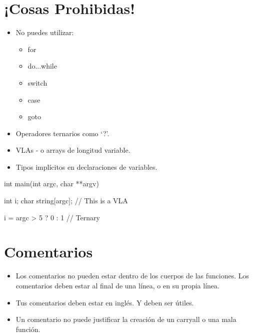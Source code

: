 \documentclass{42-es}
\begin{document}
\section{¡Cosas Prohibidas!}

\begin{itemize}
      \item No puedes utilizar:
            \begin{itemize}

                  \item for
                  \item do...while
                  \item switch
                  \item case
                  \item goto

            \end{itemize}
      \item Operadores ternarios como `?'.
      \item VLAs - o arrays de longitud variable.
      \item Tipos implícitos en declaraciones de variables.

\end{itemize}
\begin{42ccode}
      int main(int argc, char **argv)
      {
                  int i;
                  char	string[argc]; // This is a VLA

                  i = argc > 5 ? 0 : 1 // Ternary
            }
\end{42ccode}
\newpage

\section{Comentarios}

\begin{itemize}
      \item Los comentarios no pueden estar dentro de los cuerpos de las
            funciones. Los comentarios deben estar al final de una línea, o en
            su propia
            línea.
      \item Tus comentarios deben estar en inglés. Y deben ser útiles.
      \item Un comentario no puede justificar la creación de un carryall o
            una mala función.
\end{itemize}
\end{document}
